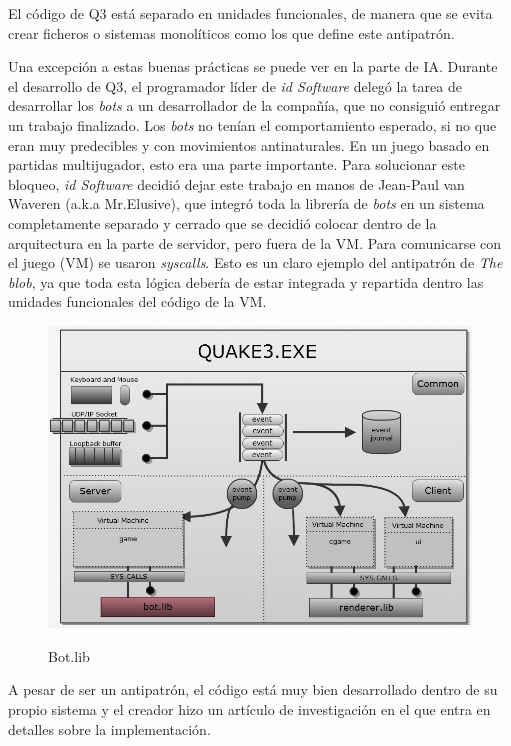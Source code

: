 \documentclass[a4paper,12pt]{report}
\begin{document}
El código de Q3 está separado en unidades funcionales, de manera que se evita crear ficheros o sistemas monolíticos como los que define este antipatrón.

Una excepción a estas buenas prácticas se puede ver en la parte de IA. Durante el desarrollo de Q3, el programador líder de \textit{id Software} delegó la tarea de desarrollar los \textit{bots} a un desarrollador de la compañía, que no consiguió entregar un trabajo finalizado. Los \textit{bots} no tenían el comportamiento esperado, si no que eran muy predecibles y con movimientos antinaturales. En un juego basado en partidas multijugador, esto era una parte importante. Para solucionar este bloqueo, \textit{id Software} decidió dejar este trabajo en manos de Jean-Paul van Waveren (a.k.a Mr.Elusive), que integró toda la librería de \textit{bots} en un sistema completamente separado y cerrado que se decidió colocar dentro de la arquitectura en la parte de servidor, pero fuera de la VM. Para comunicarse con el juego (VM) se usaron \textit{syscalls}. Esto es un claro ejemplo del antipatrón de \textit{The blob}, ya que toda esta lógica debería de estar integrada y repartida dentro las unidades funcionales del código de la VM.

	\begin{center}
	\begin{figure}[h]
		\includegraphics[width=1\textwidth]{images/bot}
		\label{fig:bot}
		\caption{Bot.lib}
	\end{figure}
\end{center}

A pesar de ser un antipatrón, el código está muy bien desarrollado dentro de su propio sistema y el creador hizo un artículo de investigación en el que entra en detalles sobre la implementación.\cite{quake3}\\
\end{document}
